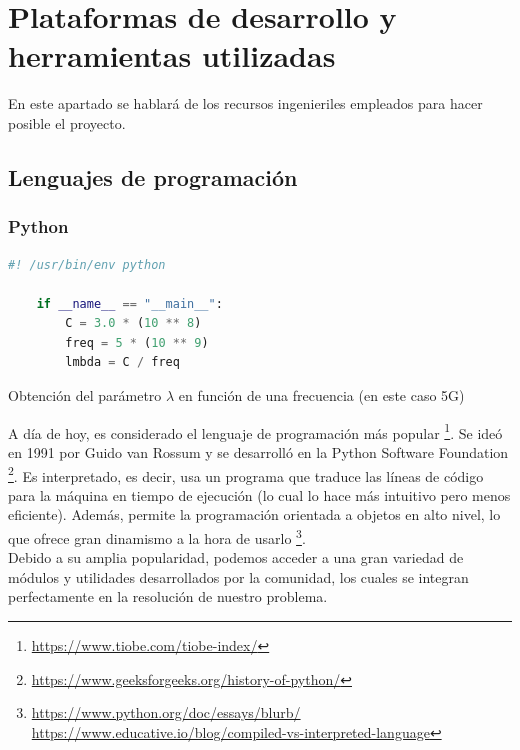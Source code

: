 \chapter{Plataformas de desarrollo y herramientas utilizadas}
\label{cap:capitulo3}

En este apartado se hablará de los recursos ingenieriles empleados para hacer posible el proyecto.

\section{Lenguajes de programación}
\label{sec:lenguajes_programacion}

\subsection{Python}
\label{subsec:python}

\begin{code}[tp]
	\begin{lstlisting}[language=Python]
	#! /usr/bin/env python
	
	if __name__ == "__main__":
		C = 3.0 * (10 ** 8)
		freq = 5 * (10 ** 9)
		lmbda = C / freq
	\end{lstlisting}
	\caption[Obtención del parámetro lambda en función de una frecuencia (en este caso 5G)]{Obtención del parámetro $\lambda$ en función de una frecuencia (en este caso 5G)}
	\label{cod:helloworld_python}
\end{code}

A día de hoy, es considerado el lenguaje de programación más popular \footnote[1]{\url{https://www.tiobe.com/tiobe-index/}}. Se ideó en 1991 por Guido van Rossum y se desarrolló en la Python Software Foundation \footnote[2]{\url{https://www.geeksforgeeks.org/history-of-python/}}. Es interpretado, es decir, usa un programa que traduce las líneas de código para la máquina en tiempo de ejecución (lo cual lo hace más intuitivo pero menos eficiente). Además, permite la programación orientada a objetos en alto nivel, lo que ofrece gran dinamismo a la hora de usarlo \footnote[3]{\url{https://www.python.org/doc/essays/blurb/} \url{https://www.educative.io/blog/compiled-vs-interpreted-language}}.\\

Debido a su amplia popularidad, podemos acceder a una gran variedad de módulos y utilidades desarrollados por la comunidad, los cuales se integran perfectamente en la resolución de nuestro problema.\\

